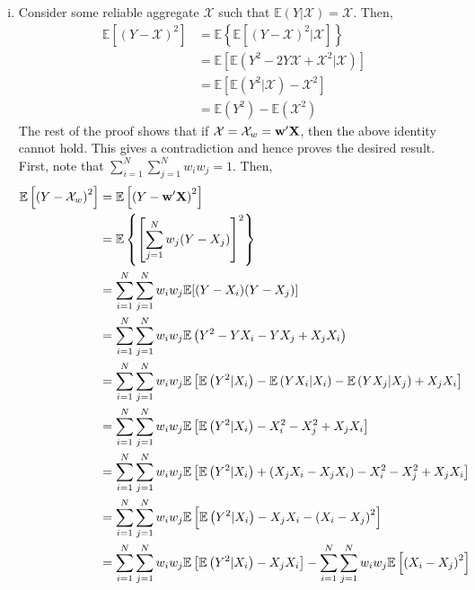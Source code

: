 \documentclass[11pt]{article}
\newcommand{\E}{\mathbb{E}}
\theoremstyle{definition}
\theoremstyle{definition}
\def\w{{\bf w}}
\def\X{{\bf X}}
\def\E{{\mathbb E}}
\begin{document}
\begin{enumerate}[i)]
\item Consider some reliable aggregate $\mathcal{X}$ such that $\E(Y | \mathcal{X}) = \mathcal{X}$. Then,
\begin{align*}
\E[(Y-\mathcal{X})^2] &= \E\left\{\E\left[(Y-\mathcal{X})^2|\mathcal{X}\right]\right\}\\
&= \E\left[\E\left(Y^2-2Y\mathcal{X}+\mathcal{X}^2|\mathcal{X} \right)\right]\\
&= \E\left[\E\left(Y^2|\mathcal{X}\right)-\mathcal{X}^2\right]\\
&= \E(Y^2)-\E(\mathcal{X}^2)
\end{align*}
The rest of the proof shows that if $\mathcal{X} = \mathcal{X}_w = \w'\X$, then the above identity cannot hold. This gives a contradiction and hence proves the desired result. First, note that $\sum_{i=1}^N\sum_{j=1}^Nw_iw_j = 1$. Then,
\begin{align*}
\E\left[\left(Y-\mathcal{X}_w\right)^2\right] &= \E\left[\left(Y-\w'\X\right)^2\right] \\
 &= \E\left\{\left[\sum_{j=1}^Nw_j (Y-X_j)\right]^2\right\} \\
&= \sum_{i=1}^N\sum_{j=1}^Nw_iw_j \E[(Y-X_i)(Y-X_j)] \\
&= \sum_{i=1}^N\sum_{j=1}^Nw_iw_j \E\left(Y^2-YX_i-YX_j+X_jX_i\right) \\
&= \sum_{i=1}^N\sum_{j=1}^Nw_iw_j \E\left[ \E\left( Y^2|X_i \right)-\E\left( YX_i|X_i \right)-\E\left( YX_j|X_j\right)+X_jX_i \right] \\
&= \sum_{i=1}^N\sum_{j=1}^Nw_iw_j \E\left[ \E\left( Y^2|X_i \right)-X_i^2-X_j^2+X_jX_i \right] \\
&= \sum_{i=1}^N\sum_{j=1}^Nw_iw_j \E\left[\E\left(Y^2|X_i\right) +\left(X_jX_i-X_jX_i\right)-X_i^2-X_j^2+X_jX_i\right] \\
&= \sum_{i=1}^N\sum_{j=1}^Nw_iw_j \E\left[\E\left(Y^2|X_i\right) -X_jX_i-\left(X_i-X_j\right)^2\right] \\
&= \sum_{i=1}^N\sum_{j=1}^Nw_iw_j \E\left[\E\left(Y^2|X_i\right) -X_jX_i\right]-\sum_{i=1}^N\sum_{j=1}^Nw_iw_j\E\left[\left(X_i-X_j\right)^2\right] \\

\end{align*}
\end{enumerate}
\end{document}
